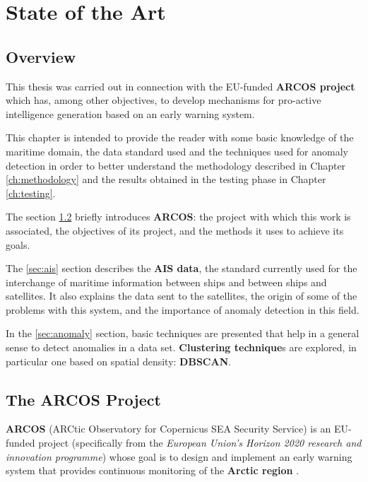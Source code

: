 \chapter{State of the Art}
\label{ch:stateOfTheArt}

\section{Overview}

This thesis was carried out in connection with the EU-funded \textbf{ARCOS project} which has, among other objectives, to develop mechanisms for pro-active intelligence generation based on an early warning system.

This chapter is intended to provide the reader with some basic knowledge of the maritime domain, the data standard used and the techniques used for anomaly detection in order to better understand the methodology described in Chapter \ref{ch:methodology} and the results obtained in the testing phase in Chapter \ref{ch:testing}.

The section \ref{sec:arcos} briefly introduces \textbf{ARCOS}: the project with which this work is associated, the objectives of its project, and the methods it uses to achieve its goals.

The \ref{sec:ais} section describes the \textbf{AIS data}, the standard currently used for the interchange of maritime information between ships and between ships and satellites. It also explains the data sent to the satellites, the origin of some of the problems with this system, and the importance of anomaly detection in this field. 

In the \ref{sec:anomaly} section, basic techniques are presented that help in a general sense to detect anomalies in a data set. \textbf{Clustering technique}s are explored, in particular one based on spatial density: \textbf{DBSCAN}.

\clearpage

\section{The ARCOS Project}
\label{sec:arcos}
\textbf{ARCOS} (ARCtic Observatory for Copernicus SEA Security Service) is an EU-funded project (specifically from the \textit{European Union’s Horizon 2020 research and innovation programme}) whose goal is to design and implement an early warning system that provides continuous monitoring of the \textbf{Arctic region} \cite{arcos}. 

